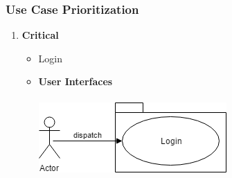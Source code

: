 \documentclass[a4paper,10pt]{article}
\begin{document}
	\subsubsection{Use Case Prioritization} 
		\begin{enumerate} 
		\item \textbf{Critical} 
			\begin{itemize} 
				\item Login
                 \item \textbf{User Interfaces}\\\\
		 \includegraphics[scale=0.62]{login.png}\\


\end{itemize}
\end{enumerate}
\end{document}
